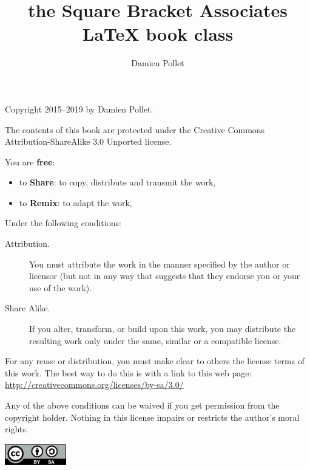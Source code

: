 \documentclass[twoside,openany,showtrims]{sbabook}
\title{the Square Bracket Associates\titlebreak{}
  \texorpdfstring{\protect\LaTeX}{LaTeX} book class}
\author{Damien Pollet}
\date{\gitdate\titlebreak[\smallskip]{ -- }\protect\gitCommitInfo}
\begin{document}
\maketitle
\pagestyle{titlingpage}
\thispagestyle{titlingpage} %

\cleartoverso
{\small

  Copyright 2015--2019 by Damien Pollet.

  The contents of this book are protected under the Creative Commons
  Attribution-ShareAlike 3.0 Unported license.

  You are \textbf{free}:
  \begin{itemize}
  \item to \textbf{Share}: to copy, distribute and transmit the work,
  \item to \textbf{Remix}: to adapt the work,
  \end{itemize}

  Under the following conditions:
  \begin{description}
  \item[Attribution.] You must attribute the work in the manner specified by the
    author or licensor (but not in any way that suggests that they endorse you
    or your use of the work).
  \item[Share Alike.] If you alter, transform, or build upon this work, you may
    distribute the resulting work only under the same, similar or a compatible
    license.
  \end{description}

  For any reuse or distribution, you must make clear to others the
  license terms of this work. The best way to do this is with a link to
  this web page: \\
  \url{http://creativecommons.org/licenses/by-sa/3.0/}

  Any of the above conditions can be waived if you get permission from
  the copyright holder. Nothing in this license impairs or restricts the
  author's moral rights.

  \begin{center}
    \includegraphics[width=0.2\textwidth]{CreativeCommons-BY-SA.pdf}
  \end{center}

}
\end{document}
